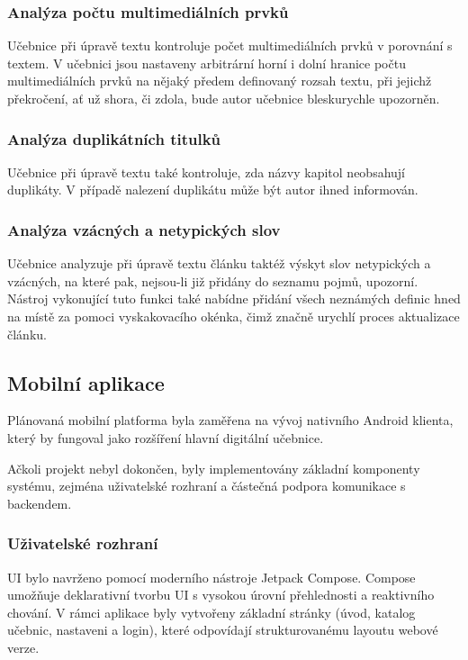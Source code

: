 \documentclass[12pt]{article}
\begin{document}
\subsubsection{Analýza počtu multimediálních prvků}
Učebnice při úpravě textu kontroluje počet multimediálních prvků v porovnání s textem. V učebnici jsou nastaveny arbitrární horní i dolní hranice počtu multimediálních prvků na nějaký předem definovaný rozsah textu, při jejichž překročení, ať už shora, či zdola, bude autor učebnice bleskurychle upozorněn.

\subsubsection{Analýza duplikátních titulků}
Učebnice při úpravě textu také kontroluje, zda názvy kapitol neobsahují duplikáty. V případě nalezení duplikátu může být autor ihned informován.

\subsubsection{Analýza vzácných a netypických slov}
Učebnice analyzuje při úpravě textu článku taktéž výskyt slov netypických a vzácných, na které pak, nejsou-li již přidány do seznamu pojmů, upozorní. Nástroj vykonující tuto funkci také nabídne přidání všech neznámých definic hned na místě za pomoci vyskakovacího okénka, čimž značně urychlí proces aktualizace článku.


\subsection{Mobilní aplikace}

Plánovaná mobilní platforma byla zaměřena na vývoj nativního Android klienta, který by fungoval jako rozšíření hlavní digitální učebnice.

Ačkoli projekt nebyl dokončen, byly implementovány základní komponenty systému, zejména uživatelské rozhraní a částečná podpora komunikace s backendem.

\subsubsection{Uživatelské rozhraní}

UI bylo navrženo pomocí moderního nástroje Jetpack Compose. Compose umožňuje deklarativní tvorbu UI s vysokou úrovní přehlednosti a reaktivního chování.
V rámci aplikace byly vytvořeny základní stránky (úvod, katalog učebnic, nastaveni a login), které odpovídají strukturovanému layoutu webové verze.
\end{document}
